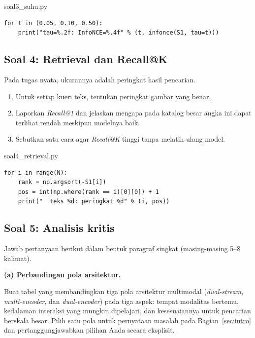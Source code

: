 \documentclass[12pt, a4paper]{article}
\begin{document}
\begin{codewindow}{soal3\_suhu.py}
\begin{lstlisting}[style=pycode]
for t in (0.05, 0.10, 0.50):
    print("tau=%.2f: InfoNCE=%.4f" % (t, infonce(S1, tau=t)))
\end{lstlisting}
\end{codewindow}

\subsection{Soal 4: Retrieval dan Recall@K}

Pada tugas nyata, ukurannya adalah peringkat hasil pencarian.

\begin{enumerate}
  \item Untuk setiap kueri teks, tentukan peringkat gambar yang benar.
  \item Laporkan \emph{Recall@1} dan jelaskan mengapa pada katalog besar angka ini
        dapat terlihat rendah meskipun modelnya baik.
  \item Sebutkan satu cara agar \emph{Recall@K} tinggi tanpa melatih ulang model.
\end{enumerate}

\begin{codewindow}{soal4\_retrieval.py}
\begin{lstlisting}[style=pycode]
for i in range(N):
    rank = np.argsort(-S1[i])
    pos = int(np.where(rank == i)[0][0]) + 1
    print("  teks %d: peringkat %d" % (i, pos))
\end{lstlisting}
\end{codewindow}

\clearpage
\subsection{Soal 5: Analisis kritis}

Jawab pertanyaan berikut dalam bentuk paragraf singkat (masing-masing 5--8 kalimat).

\textbf{(a) Perbandingan pola arsitektur.}

Buat tabel yang membandingkan tiga pola arsitektur multimodal (\emph{dual-stream},
\emph{multi-encoder}, dan \emph{dual-encoder}) pada tiga aspek: tempat modalitas
bertemu, kedalaman interaksi yang mungkin dipelajari, dan kesesuaiannya untuk
pencarian berskala besar. Pilih satu pola untuk pernyataan masalah pada
Bagian~\ref{sec:intro} dan pertanggungjawabkan pilihan Anda secara eksplisit.
\end{document}
